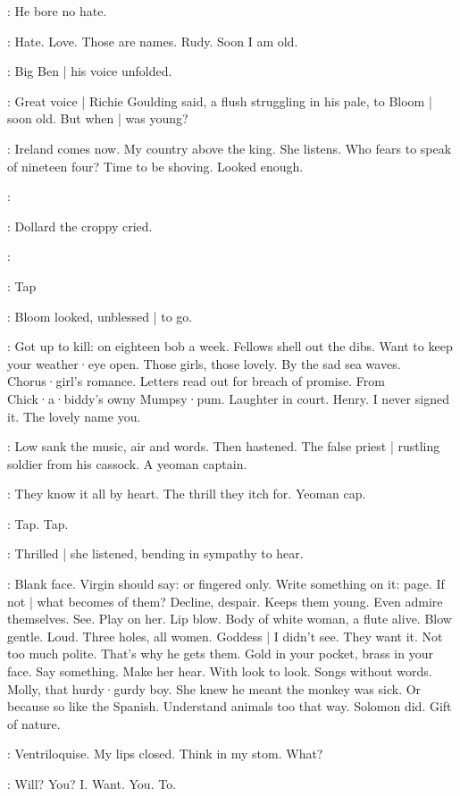 :
He bore no hate.

\BloomIntB:
Hate.
Love.
Those are names.
Rudy.
Soon I am old.

:
Big Ben |
his voice unfolded.

:
Great voice |
Richie Goulding said,
a flush struggling in his pale,
to Bloom |
soon old.
But when |
was young?

\BloomIntA:
Ireland comes now.
My country above the king.
She listens.
Who fears to speak of nineteen four?
Time to be shoving.
Looked enough.

\dollard:

:
Dollard the croppy cried.

\dollard:

\stripling:
Tap

:
Bloom looked,
unblessed |
to go.

\BloomIntB:
Got up to kill:
on eighteen bob a week.
Fellows shell out the dibs.
Want to keep your weather·eye open.
Those girls,
those lovely.
By the sad sea waves.
Chorus·girl's romance.
Letters read out for breach of promise.
From Chick·a·biddy's owny Mumpsy·pum.
Laughter in court.
Henry.
I never signed it.
The lovely name you.

:
Low sank the music,
air and words.
Then hastened.
The false priest |
rustling soldier from his cassock.
A yeoman captain.

\BloomIntA:
They know it all by heart.
The thrill they itch for.
Yeoman cap.

\stripling:
Tap.
Tap.

:
Thrilled |
she listened,
bending in sympathy to hear.

\BloomIntB:
Blank face.
Virgin should say:
or fingered only.
Write something on it:
page.
If not |
what becomes of them?
Decline,
despair.
Keeps them young.
Even admire themselves.
See.
Play on her.
Lip blow.
Body of white woman,
a flute alive.
Blow gentle.
Loud.
Three holes,
all women.
Goddess |
I didn't see.
They want it.
Not too much polite.
That's why he gets them.
Gold in your pocket,
brass in your face.
Say something.
Make her hear.
With look to look.
Songs without words.
Molly,
that hurdy·gurdy boy.
She knew he meant the monkey was sick.
Or because so like the Spanish.
Understand animals too that way.
Solomon did.
Gift of nature.

\BloomIntB:
Ventriloquise.
My lips closed.
Think in my stom.
What?

\BloomIntB:
Will?
You?
I\@.
Want.
You.
To.

